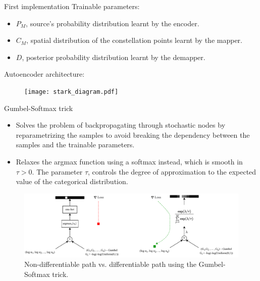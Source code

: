 \documentclass[english,aspectratio=1610,9pt,helvet,nicetitles]{ICEbeamerTUMCD}
\begin{document}
\begin{frame}{First implementation \cite{Stark}}
	Trainable parameters:
	\vspace{-5mm}
	\begin{itemize}
		\item $P_M$, source's probability distribution learnt by the encoder.
		\item $C_M$, spatial distribution of the constellation points learnt by the mapper.
		\item $D$, posterior probability distribution learnt by the demapper.
	\end{itemize}
	\vspace{-5mm}
	Autoencoder architecture:
	\begin{figure}
		\centering
		\texttt{[image: stark\_diagram.pdf]}
		\label{fig:starkAe}
	\end{figure}
\end{frame}

\begin{frame}{Gumbel-Softmax trick \cite{JANG}}
\begin{itemize}
\item Solves the problem of backpropagating through stochastic nodes by reparametrizing the samples to avoid breaking the dependency between the samples and the trainable parameters.
\item Relaxes the argmax function using a softmax instead, which is smooth in $\tau > 0$. The parameter $\tau$, controls the degree of approximation to the expected value of the categorical distribution.
\end{itemize}
\begin{figure}
\includegraphics[width=0.85\columnwidth]{ressources/Gumbel_Softmax.pdf}
\caption{ Non-differentiable path vs. differentiable path using the Gumbel-Softmax trick. }
\end{figure}
\end{frame}
\end{document}
